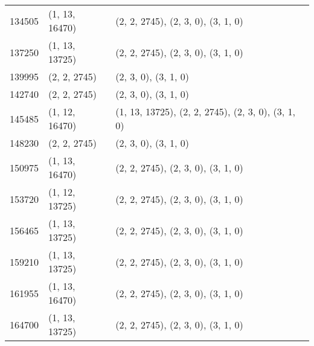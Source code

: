 \begin{center}
\begin{longtable}{|l|l|l|}
		134505 & (1, 13, 16470) & (2, 2, 2745), (2, 3, 0), (3, 1, 0) \\
		137250 & (1, 13, 13725) & (2, 2, 2745), (2, 3, 0), (3, 1, 0) \\
		139995 & (2, 2, 2745) & (2, 3, 0), (3, 1, 0) \\
		142740 & (2, 2, 2745) & (2, 3, 0), (3, 1, 0) \\
		145485 & (1, 12, 16470) & (1, 13, 13725), (2, 2, 2745), (2, 3, 0), (3, 1, 0) \\
		148230 & (2, 2, 2745) & (2, 3, 0), (3, 1, 0) \\
		150975 & (1, 13, 16470) & (2, 2, 2745), (2, 3, 0), (3, 1, 0) \\
		153720 & (1, 12, 13725) & (2, 2, 2745), (2, 3, 0), (3, 1, 0) \\
		156465 & (1, 13, 13725) & (2, 2, 2745), (2, 3, 0), (3, 1, 0) \\
		159210 & (1, 13, 13725) & (2, 2, 2745), (2, 3, 0), (3, 1, 0) \\
		161955 & (1, 13, 16470) & (2, 2, 2745), (2, 3, 0), (3, 1, 0) \\
		164700 & (1, 13, 13725) & (2, 2, 2745), (2, 3, 0), (3, 1, 0) \\
	\end{longtable}
\end{center}



